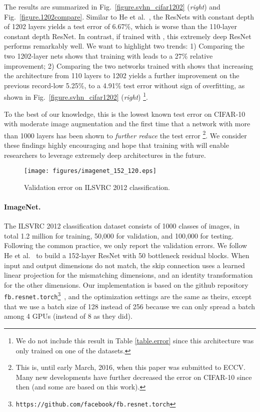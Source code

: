 \documentclass[runningheads]{llncs}
\begin{document}
The results are summarized in Fig.~\ref{figure.svhn_cifar1202} (\textit{right}) and Fig.~\ref{figure.1202compare}. Similar to He et al.~\cite{he2015deep}, the ResNets with constant depth of 1202 layers yields a test error of 6.67\%, which is worse than the 110-layer constant depth ResNet. In contrast, if trained with \name{}, this extremely deep ResNet performs remarkably well. We want to highlight two trends: 1) Comparing the two 1202-layer nets shows that training with \name{} leads to a 27\% relative improvement; 2) Comparing the two networks trained with \name{}  shows that increasing the architecture from 110 layers to 1202 yields a further improvement on the previous record-low 5.25\%, to a 4.91\% test error without sign of overfitting, as shown in Fig.~\ref{figure.svhn_cifar1202} (\textit{right}) \footnote{We do not include this result in Table \ref{table.error} since this architecture was only trained on one of the datasets.}.

To the best of our knowledge, this is the lowest known test error on CIFAR-10 with moderate image augmentation and the first time that a network with more than 1000 layers has been shown to \emph{further reduce} the test error \footnote{This is, until early March, 2016, when this paper was submitted to ECCV. Many new developments have further decreased the error on CIFAR-10 since then (and some are based on this work).}. We consider these findings highly encouraging and hope that training with \name{} will enable researchers to leverage extremely deep architectures in the future.

\begin{wrapfigure}{t}{0.5\textwidth}
	\begin{center}
		\vspace{-8ex}
		\centerline{\texttt{[image: figures/imagenet\_152\_120.eps]}}
		\vspace{-2ex}
		\caption{Validation error on ILSVRC 2012 classification.}
		\vspace{-8ex}
		\label{figure.imagenet}
	\end{center}
\end{wrapfigure}

\paragraph{\textbf{ImageNet.}}
The ILSVRC 2012 classification dataset consists of 1000 classes of images, in total 1.2 million for training, 50,000 for validation, and 100,000 for testing. Following the common practice, we only report the validation errors. We follow He et al.~\cite{he2015deep} to build a 152-layer ResNet with 50 bottleneck residual blocks. When input and output dimensions do not match, the skip connection uses a learned linear projection for the mismatching dimensions, and an identity transformation for the other dimensions. Our implementation is based on the github repository {\tt fb.resnet.torch\footnote{\tt https://github.com/facebook/fb.resnet.torch}}~\cite{blogpostresnet}, and the optimization settings are the same as theirs, except that we use a batch size of 128 instead of 256 because we can only spread a batch among 4 GPUs (instead of 8 as they did).
\end{document}

